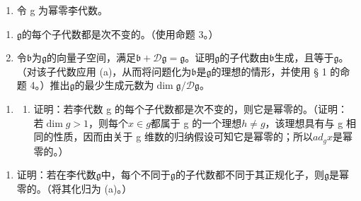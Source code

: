 \begin{enumerate}
\def\labelenumi{\arabic{enumi}.}
\setcounter{enumi}{3}
\tightlist
\item
  令 g 为幂零李代数。
\end{enumerate}

\begin{enumerate}
\def\labelenumi{(\alph{enumi})}
\item
  \(\mathfrak{g}\)的每个子代数都是次不变的。（使用命题 3。）
\item
  令\(\mathfrak{b}\)为\(\mathfrak{g}\)的向量子空间，满足\(\mathfrak{b} + \mathcal{D}\mathfrak{g} = \mathfrak{g}\)。证明\(\mathfrak{g}\)的子代数由\(\mathfrak{b}\)生成，且等于\(\mathfrak{g}\)。（对该子代数应用 (a)，从而将问题化为\(\mathfrak{b}\)是\(\mathfrak{g}\)的理想的情形，并使用 § 1 的命题 4。）推出\(\mathfrak{g}\)的最少生成元数为\(\dim \mathfrak{g}/\mathcal{D}\mathfrak{g}\)。
\end{enumerate}

\begin{enumerate}
\def\labelenumi{\arabic{enumi}.}
\setcounter{enumi}{4}
\tightlist
\item
  \begin{enumerate}
  \def\labelenumii{(\alph{enumii})}
  \tightlist
  \item
    证明：若李代数 g 的每个子代数都是次不变的，则它是幂零的。（证明：若\(\dim g > 1\)，则每个\(x \in g\)都属于 g 的一个理想\(h \neq g\)，该理想具有与 g 相同的性质，因而由关于 g 维数的归纳假设可知它是幂零的；所以\(ad_{g} x\)是幂零的。）
  \end{enumerate}
\end{enumerate}

\begin{enumerate}
\def\labelenumi{(\alph{enumi})}
\setcounter{enumi}{1}
\tightlist
\item
  证明：若在李代数\(\mathfrak{g}\)中，每个不同于\(\mathfrak{g}\)的子代数都不同于其正规化子，则\(\mathfrak{g}\)是幂零的。（将其化归为 (a)。）
\end{enumerate}

